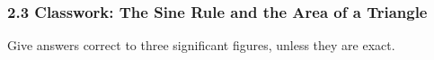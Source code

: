 \documentclass[12pt, twoside]{article}
\begin{document}
\subsubsection*{2.3 Classwork: The Sine Rule and the Area of a Triangle}

\begin{center}
\end{center}

Give answers correct to three significant figures, unless they are exact.
\end{document}
